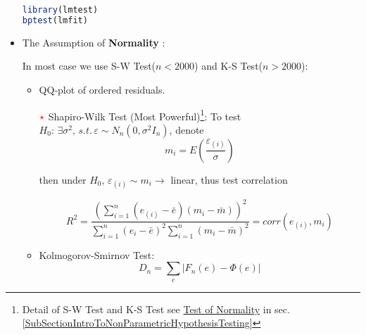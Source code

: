 \begin{itemize}[topsep=2pt,itemsep=2pt]
\begin{rcode}
\begin{lstlisting}[language=R]
library(lmtest)
bptest(lmfit)
\end{lstlisting}

\end{rcode}

    \item The Assumption of \textbf{Normality} :
    
    In most case we use S-W Test($ n<2000 $) and K-S Test($ n>2000 $):
    \begin{itemize}[topsep=2pt,itemsep=2pt]
        \item QQ-plot of ordered residuals.
        
        \item[$ {\color{red}\star}  $] Shapiro-Wilk Test (Most Powerful)\footnote{Detail of S-W Test and K-S Test see \hyperlink{testofnormality}{Test of Normality} in sec.\ref{SubSectionIntroToNonParametricHypothesisTesting}}: To test $ H_0: \,\exists \sigma ^2, \,s.t. \,\varepsilon \sim N_n(0,\sigma ^2I_n)  $, denote 
        \[
            m_i=E(\dfrac{\varepsilon _{(i)} }{\sigma }) 
        \]

        then under $H_0 $, $ \varepsilon _{(i)}\sim m_i \to $ linear, thus test correlation 
        
        \begin{equation}
            R^2=\dfrac{\left(\sum_{i=1}^n(e_{(i)}-\bar{e})(m_i-\bar{m})\right)^2}{\sum_{i=1}^n(e_{i}-\bar{e})^2\sum_{i=1}^n(m_i-\bar{m})^2}=corr(e_{(i)},m_i) 
        \end{equation}
        
        \item Kolmogorov-Smirnov Test: 
        \begin{equation}
            D_n=\sum_{e}|F_n(e)-\Phi(e)|
        \end{equation}
        

\end{itemize}
\end{itemize}
